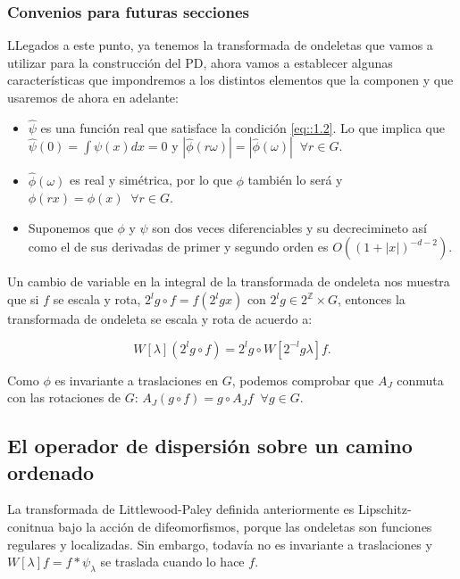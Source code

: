 \medskip


\subsubsection{Convenios para futuras secciones}

\noindent LLegados a este punto, ya tenemos la transformada de ondeletas que vamos a utilizar para la construcción del PD, ahora vamos a establecer algunas características que impondremos a los distintos elementos que la componen y que usaremos de ahora en adelante: 

\begin{itemize}
    \item $\widehat{\psi}$ es una función real que satisface la condición \eqref{eq::1.2}. Lo que implica que $\widehat{\psi}(0)=\int \psi(x)dx=0$ y $|\widehat{\phi}(r\omega)|=|\widehat{\phi}(\omega)| \;\; \forall r\in G$.
    \item $\widehat{\phi}(\omega)$ es real y simétrica, por lo que $\phi$ también lo será y $\phi(rx)=\phi(x) \;\; \forall r \in G$. 
    \item Suponemos que $\phi$ y $\psi$ son dos veces diferenciables y su decrecimineto así como el de sus derivadas de primer y segundo orden es $O((1+|x|)^{-d-2})$.
\end{itemize}

\medskip

\noindent Un cambio de variable en la integral de la transformada de ondeleta nos muestra que si $f$ se escala y rota, $2^lg \circ f=f(2^lgx)$ con $2^lg \in 2^{\mathbb{Z}} \times G$, entonces la transformada de ondeleta se escala y rota de acuerdo a: 

\begin{equation}
  W[\lambda](2^lg\circ f)=2^lg \circ W[2^{-l}g\lambda]f.
\end{equation}

\medskip

\noindent Como $\phi$ es invariante a traslaciones en $G$, podemos comprobar que $A_J$ conmuta con las rotaciones de $G$: $A_J(g\circ f)=g\circ A_J f \;\; \forall g \in G$. 

\subsection{El operador de dispersión sobre un camino ordenado}

\noindent La transformada de Littlewood-Paley definida anteriormente es Lipschitz-conitnua bajo la acción de difeomorfismos, porque las ondeletas son funciones regulares y localizadas. Sin embargo, todavía no es invariante a traslaciones y $W[\lambda]f=f\ast\psi_\lambda$ se traslada cuando lo hace $f$.

